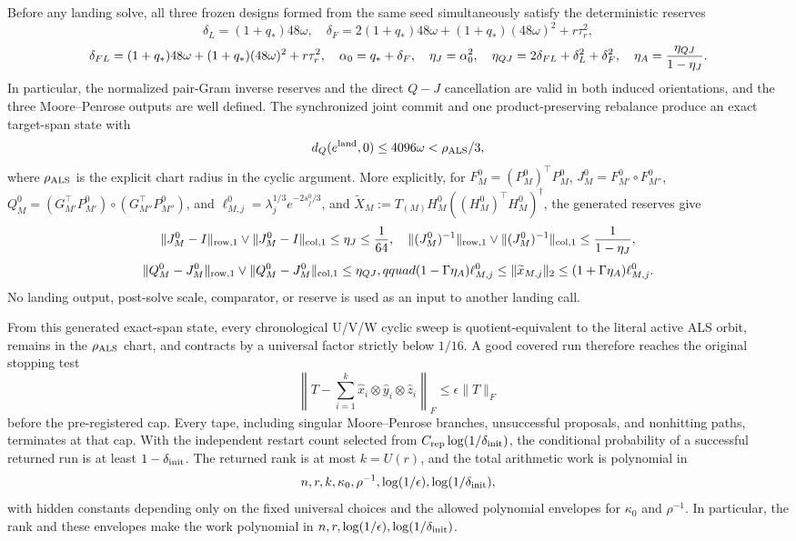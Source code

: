 \begin{theorem}
Before any landing solve, all three frozen designs formed from the same seed
simultaneously satisfy the deterministic reserves
\[
\delta_L=(1+q_*)48\omega,\quad
\delta_F=2(1+q_*)48\omega+(1+q_*)(48\omega)^2+r\tau_r^2,
\]
\[
\delta_{FL}=(1+q_*)48\omega+(1+q_*)(48\omega)^2+r\tau_r^2,\quad
\alpha_0=q_*+\delta_F,\quad \eta_J=\alpha_0^2,\quad
\eta_{QJ}=2\delta_{FL}+\delta_L^2+\delta_F^2,\quad
\eta_A={\eta_{QJ}\over1-\eta_J}.
\]
In particular, the normalized pair-Gram inverse reserves and the direct
$Q-J$ cancellation are valid in both induced orientations, and the three
Moore--Penrose outputs are well defined.  The synchronized joint commit and
one product-preserving rebalance produce an exact target-span state with
\[
 d_Q(e^{\rm land},0)\le4096\omega<\rho_{\rm ALS}/3,
\]
where $\rho_{\rm ALS}$ is the explicit chart radius in the cyclic argument.
More explicitly, for $F_M^0=(P_M^0)^\top P_M^0$,
$J_M^0=F_{M'}^0\circ F_{M''}^0$,
$Q_M^0=(G_{M'}^\top P_{M'}^0)\circ(G_{M''}^\top P_{M''}^0)$, and
$\ell_{M,j}^0=\lambda_j^{1/3}e^{-2s_j^0/3}$, and
$\widetilde X_M:=T_{(M)}H_M^0((H_M^0)^\top H_M^0)^\dagger$, the generated reserves give
\[
 \|J_M^0-I\|_{\rm row,1}\vee\|J_M^0-I\|_{\rm col,1}\le\eta_J\le{1\over64},
 \quad
 \|(J_M^0)^{-1}\|_{\rm row,1}\vee\|(J_M^0)^{-1}\|_{\rm col,1}
 \le{1\over1-\eta_J},
\]
\[
 \|Q_M^0-J_M^0\|_{\rm row,1}\vee\|Q_M^0-J_M^0\|_{\rm col,1}\le\eta_{QJ},qquad
 (1-\Gamma\eta_A)\ell_{M,j}^0\le\|\widetilde x_{M,j}\|_2
 \le(1+\Gamma\eta_A)\ell_{M,j}^0.
\]
No landing output, post-solve scale, comparator, or reserve is used as an
input to another landing call.

From this generated exact-span state, every chronological U/V/W cyclic sweep
is quotient-equivalent to the literal active ALS orbit, remains in the
$\rho_{\rm ALS}$ chart, and contracts by a universal factor strictly below
$1/16$.  A good covered run therefore reaches the original stopping test
\[
 \left\|T-\sum_{i=1}^k\widehat x_i\otimes\widehat y_i\otimes\widehat z_i
 \right\|_F\le\epsilon\|T\|_F
\]
before the pre-registered cap.  Every tape, including singular
Moore--Penrose branches, unsuccessful proposals, and nonhitting paths,
terminates at that cap.  With the independent restart count selected from
$C_{\rm rep}\log(1/\delta_{\rm init})$, the conditional probability of a
successful returned run is at least $1-\delta_{\rm init}$.  The returned rank
is at most $k=U(r)$, and the total arithmetic work is polynomial in
\[
 n,r,k,\kappa _0,\rho^{-1},\log(1/\epsilon),
 \log(1/\delta_{\rm init}),
\]
with hidden constants depending only on the fixed universal choices and the
allowed polynomial envelopes for $\kappa _0$ and $\rho^{-1}$.  In particular,
the rank and these envelopes make the work polynomial in
$n,r,\log(1/\epsilon),\log(1/\delta_{\rm init})$.


\end{theorem}
